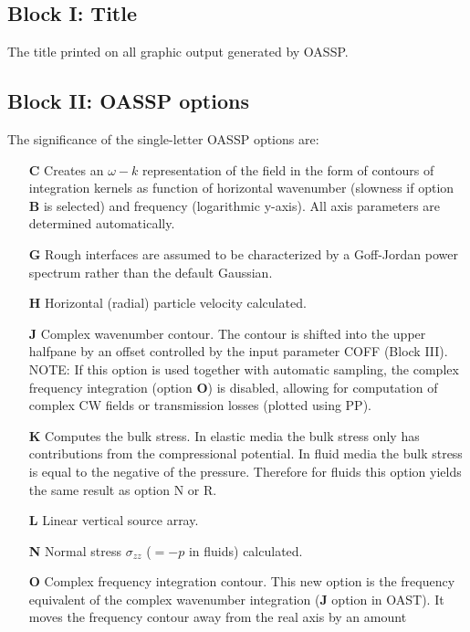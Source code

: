 \subsection{Block I: Title}

The title printed on all graphic output generated by OASSP.

\subsection{Block II: OASSP options}

The significance of the single-letter OASSP options are:
\begin{itemize}
    \item[{\bf C}] Creates an $ \omega - k$ representation of the
      field in the form of contours of integration kernels as function
      of horizontal wavenumber (slowness if option {\bf B} is
      selected) and frequency (logarithmic y-axis). All axis
      parameters are determined automatically.  
\item[{\bf G}] Rough
      interfaces are assumed to be characterized by a Goff-Jordan
      power spectrum rather than the default Gaussian.  
\item[{\bf H}]
      Horizontal (radial) particle velocity calculated.  
\item[{\bf J}] Complex wavenumber contour. The contour is shifted into the
      upper halfpane by an offset controlled by the input parameter
      COFF (Block III). NOTE: If this option is used together with
      automatic sampling, the complex frequency integration (option
      {\bf O}) is disabled, allowing for computation of complex CW
      fields or transmission losses (plotted using PP). 
\item[{\bf K}]
      Computes the bulk stress. In elastic media the bulk stress only
      has contributions from the compressional potential. In fluid
      media the bulk stress is equal to the negative of the pressure.
      Therefore for fluids this option yields the same result as
      option N or R.  
\item[{\bf L}] Linear vertical source array.
\item[{\bf N}] Normal stress $\sigma_{zz}$ ($=-p$ in fluids)
      calculated.  
\item[{\bf O}] Complex frequency integration
      contour. This new option is the frequency equivalent of the
      complex wavenumber integration ({\bf J} option in OAST). It
      moves the frequency contour away from the real axis by an amount

\end{itemize}

